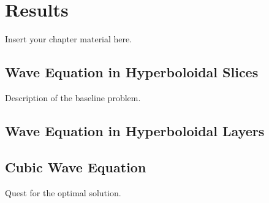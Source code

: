 
\chapter{Results}
\label{chapter:results}

Insert your chapter material here.


\section{Wave Equation in Hyperboloidal Slices}
\label{section:problem}

Description of the baseline problem.


\section{Wave Equation in Hyperboloidal Layers}
\label{section:baseline}




\section{Cubic Wave Equation}
\label{section:enhanced}

Quest for the optimal solution.


